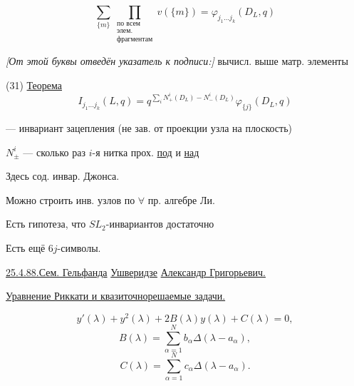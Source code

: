 \begin{equation*}
\sum_{\{m\}}\prod_{\substack{\text{по всем}\\\text{элем.}\\\text{фрагментам}}}
v(\{m\})=\varphi_{j_1\ldots j_k}(D_L,q)
\tag{30}
\end{equation*}

\textit{[От этой буквы отведён указатель к подписи:]} вычисл. выше матр. элементы

(31) \underline{Теорема}
\begin{equation*}
I_{j_1\ldots j_k}(L,q)
=q^{\sum_i N_+^i(D_L)-N_-^i(D_L)}\varphi_{\{j\}}(D_L,q)
\end{equation*}

--- инвариант зацепления (не зав. от проекции узла на плоскость)

$N_\pm^i$ --- сколько раз $i$-я нитка прох. \underline{под} и \underline{над}

Здесь сод. инвар. Джонса.

Можно  строить инв. узлов по $\forall$ пр. алгебре Ли.

Есть гипотеза, что $SL_2$-инвариантов достаточно

Есть ещё $6j$-символы.


\underline{25.4.88.}\quad\underline{Сем. Гельфанда}
\qquad
\underline{Ушверидзе}
\underline{Александр Григорьевич.}

\underline{Уравнение Риккати и квазиточнорешаемые задачи.}

\begin{equation*}
y'(\lambda)+y^2(\lambda)+2B(\lambda)y(\lambda)+C(\lambda)=0,
\tag{1}
\end{equation*}
\begin{equation*}
B(\lambda)=\sum_{\alpha=1}^N b_\alpha\Delta(\lambda-a_\alpha),
\tag{2}
\end{equation*}
\begin{equation*}
C(\lambda)=\sum_{\alpha=1}^N c_\alpha\Delta(\lambda-a_\alpha).
\tag{3}
\end{equation*}

